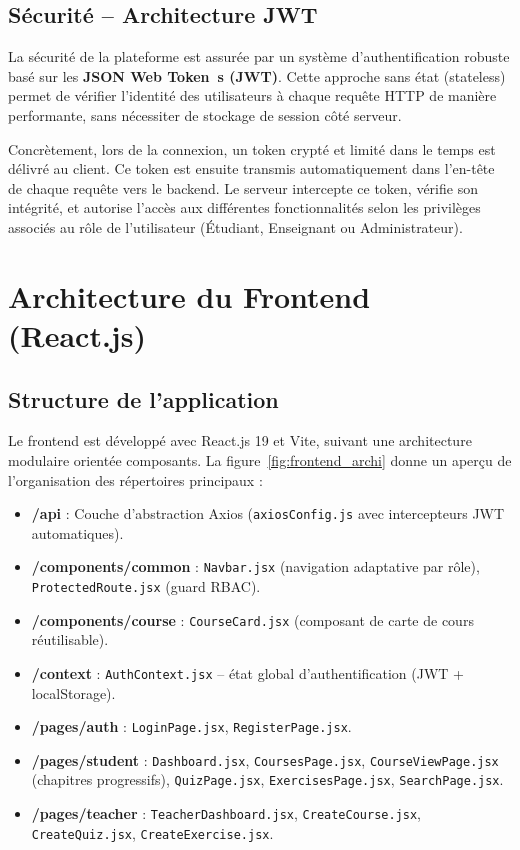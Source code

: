 \documentclass[12pt,a4paper]{report}
\begin{document}
\subsection{Sécurité -- Architecture JWT}

La sécurité de la plateforme est assurée par un système d'authentification robuste basé sur les \textbf{JSON Web Token~\cite{jwt}s (JWT)}. Cette approche sans état (stateless) permet de vérifier l'identité des utilisateurs à chaque requête HTTP de manière performante, sans nécessiter de stockage de session côté serveur. 

Concrètement, lors de la connexion, un token crypté et limité dans le temps est délivré au client. Ce token est ensuite transmis automatiquement dans l'en-tête de chaque requête vers le backend. Le serveur intercepte ce token, vérifie son intégrité, et autorise l'accès aux différentes fonctionnalités selon les privilèges associés au rôle de l'utilisateur (Étudiant, Enseignant ou Administrateur).

\section{Architecture du Frontend (React.js)}

\subsection{Structure de l'application}

Le frontend est développé avec React.js 19 et Vite, suivant une architecture modulaire orientée composants. La figure~\ref{fig:frontend_archi} donne un aperçu de l'organisation des répertoires principaux :

\begin{itemize}
  \item \textbf{/api} : Couche d'abstraction Axios (\texttt{axiosConfig.js} avec intercepteurs JWT automatiques).
  \item \textbf{/components/common} : \texttt{Navbar.jsx} (navigation adaptative par rôle), \texttt{ProtectedRoute.jsx} (guard RBAC).
  \item \textbf{/components/course} : \texttt{CourseCard.jsx} (composant de carte de cours réutilisable).
  \item \textbf{/context} : \texttt{AuthContext.jsx} -- état global d'authentification (JWT + localStorage).
  \item \textbf{/pages/auth} : \texttt{LoginPage.jsx}, \texttt{RegisterPage.jsx}.
  \item \textbf{/pages/student} : \texttt{Dashboard.jsx}, \texttt{CoursesPage.jsx}, \texttt{CourseViewPage.jsx} (chapitres progressifs), \texttt{QuizPage.jsx}, \texttt{ExercisesPage.jsx}, \texttt{SearchPage.jsx}.
  \item \textbf{/pages/teacher} : \texttt{TeacherDashboard.jsx}, \texttt{CreateCourse.jsx}, \texttt{CreateQuiz.jsx}, \texttt{CreateExercise.jsx}.
\end{itemize}
\end{document}
